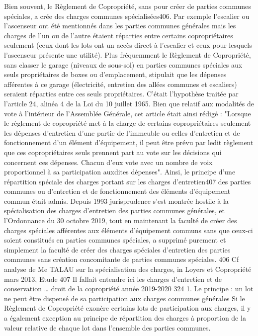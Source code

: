 		Bien souvent, le Règlement de Copropriété, sans pour créer de parties communes spéciales, a crée des charges communes spécialisées406.
		Par exemple l’escalier ou l’ascenseur ont été mentionnés dans les parties communes générales mais les charges de l’un ou de l’autre étaient réparties entre certains copropriétaires seulement (ceux dont les lots ont un accès direct à l’escalier et ceux pour lesquels l’ascenseur présente une utilité).
		Plus fréquemment le Règlement de Copropriété, sans classer le garage (niveaux de sous-sol) en parties communes spéciales aux seuls propriétaires de boxes ou d'emplacement, stipulait que les dépenses afférentes à ce garage (électricité, entretien des allées communes et escaliers) seraient réparties entre ces seuls propriétaires.
		C’était l’hypothèse traitée par l’article 24, alinéa 4 de la Loi du 10 juillet 1965. Bien que relatif aux modalités de vote à l'intérieur de l'Assemblée Générale, cet article était ainsi rédigé :
		"Lorsque le règlement de copropriété met à la charge de certains copropriétaires seulement les dépenses d'entretien d'une partie de l'immeuble ou celles d'entretien et de fonctionnement d'un élément d'équipement, il peut être prévu par ledit règlement que ces copropriétaires seuls prennent part au vote sur les décisions qui concernent ces dépenses. Chacun d'eux vote avec un nombre de voix proportionnel à sa participation auxdites dépenses".
		Ainsi, le principe d’une répartition spéciale des charges portant sur les charges d’entretien407 des parties communes ou d’entretien et de fonctionnement des éléments d’équipement commun était admis.
		Depuis 1993 jurisprudence s’est montrée hostile à la spécialisation des charges d’entretien des parties communes générales, et l’Ordonnance du 30 octobre 2019, tout en maintenant la faculté de créer des charges spéciales afférentes aux éléments d’équipement communs sans que ceux-ci soient constitués en parties communes spéciales, a supprimé purement et simplement la faculté de créer des charges spéciales d’entretien des parties communes sans création concomitante de parties communes spéciales.
		406 Cf analyse de Me TALAU sur la spécialisation des charges, in Loyers et Copropriété mars 2013, Etude 
		407 Il fallait entendre ici les charges d’entretien et de conservation …
		droit de la copropriété année 2019-2020
		324
		1. Le principe : un lot ne peut être dispensé de sa participation aux charges communes générales
		Si le Règlement de Copropriété exonère certains lots de participation aux charges, il y a également exception au principe de répartition des charges à proportion de la valeur relative de chaque lot dans l'ensemble des parties communes.
